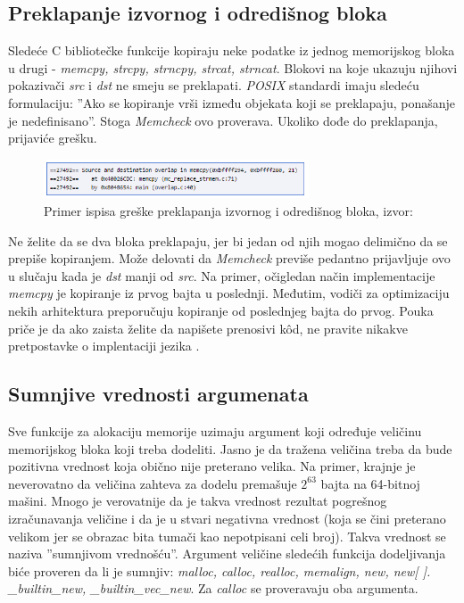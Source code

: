 \documentclass[12pt,oneside]{memoir}
\theoremstyle{plain}
\theoremstyle{definition}
\begin{document}
\subsection{Preklapanje izvornog i odredišnog bloka}
Sledeće C bibliotečke funkcije kopiraju neke podatke iz jednog memorijskog bloka u drugi - \textit{memcpy, strcpy, strncpy, strcat, strncat}.  Blokovi na koje ukazuju njihovi pokazivači \textit{src} i \textit{dst} ne smeju se preklapati. \textit{POSIX} standardi imaju sledeću formulaciju: ''Ako se kopiranje vrši između objekata koji se preklapaju, ponašanje je nedefinisano''.  Stoga \textit{Memcheck} ovo proverava. Ukoliko dođe do preklapanja, prijaviće grešku.
\begin{figure}[!ht]
  \centering
  \includegraphics[width=0.7\textwidth]{overlapError.png}
  \caption{Primer ispisa greške preklapanja izvornog i odredišnog bloka, izvor: \cite{Memcheck}}
  \label{fig:slika2.10}
\end{figure}
Ne želite da se dva bloka preklapaju, jer bi jedan od njih mogao delimično da se prepiše kopiranjem. Može delovati da \textit{Memcheck} previše pedantno prijavljuje ovo u slučaju kada je \textit{dst} manji od \textit{src}. Na primer, očigledan način implementacije \textit{memcpy}  je kopiranje iz prvog bajta u poslednji. Međutim, vodiči za optimizaciju nekih arhitektura preporučuju kopiranje od poslednjeg bajta do prvog. Pouka priče je da ako zaista želite da napišete prenosivi k\^od, ne pravite nikakve pretpostavke o implentaciji jezika \cite{Memcheck}. 

\subsection{Sumnjive vrednosti argumenata}
Sve funkcije za alokaciju memorije uzimaju argument koji određuje veličinu memorijskog bloka koji treba dodeliti. Jasno je da tražena veličina treba da bude pozitivna vrednost koja obično nije preterano velika. Na primer, krajnje je neverovatno da veličina zahteva za dodelu premašuje ${2}^{63}$ bajta na 64-bitnoj mašini. Mnogo je verovatnije da je takva vrednost rezultat pogrešnog izračunavanja veličine i da je u stvari negativna vrednost (koja se čini preterano velikom jer se obrazac bita tumači kao nepotpisani celi broj). Takva vrednost se naziva ''sumnjivom vrednošću''. Argument veličine sledećih funkcija dodeljivanja biće proveren da li je sumnjiv: \textit{malloc, calloc, realloc, memalign, new, new[ ]. \_builtin\_new, \_builtin\_vec\_new}. Za \textit{calloc} se proveravaju oba argumenta.
\end{document}
